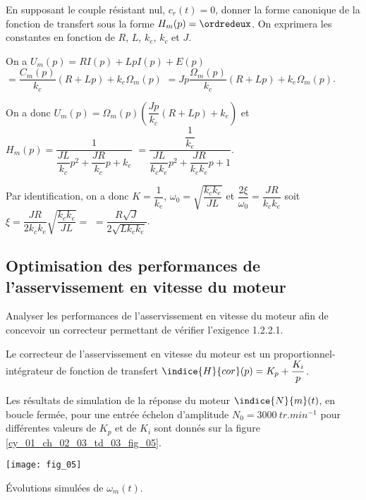 \begin{question}
En supposant le couple résistant nul, $c_r(t) = 0$, donner la forme canonique de la fonction de
transfert  sous la forme $H_m(p) = \ordredeux$. On exprimera les constantes en fonction de $R$, $L$, $k_e$, $k_c$ et $J$.
\end{question}
\ifprof
\begin{corrige}
On a $U_m(p) = RI(p) + L pI(p) + E(p)$
$ =  \dfrac{C_m(p)}{k_c} \left(R+ Lp\right) + k_e\Omega_m(p) $
$ =  Jp\dfrac{\Omega_m(p)}{k_c} \left(R+ Lp\right) + k_e\Omega_m(p) $.

On a donc 
$U_m(p) =\Omega_m(p)\left(\dfrac{Jp}{k_c} \left(R+ Lp\right) + k_e\right) $ 
et $H_m(p)=\dfrac{1}{\dfrac{JL}{k_c}p^2 +\dfrac{JR}{k_c}p + k_e}$
$=\dfrac{\dfrac{1}{k_e}}{\dfrac{JL}{k_ck_e}p^2 +\dfrac{JR}{k_ck_e}p + 1}$.

Par identification, on a donc $K= \dfrac{1}{k_e}$, $\omega_0 =\sqrt{ \dfrac{k_ck_e}{JL}}$ et
$\dfrac{2\xi}{\omega_0}= \dfrac{JR}{k_ck_e}$ soit $\xi =  \dfrac{JR}{2 k_ck_e}\sqrt{ \dfrac{k_ck_e}{JL}} = $
$=  \dfrac{R\sqrt{J}}{2 \sqrt{L k_ck_e}} $.

\end{corrige}
\else
\fi


\subsection*{Optimisation des performances de l’asservissement en vitesse du moteur}
\begin{obj}
Analyser les performances de l’asservissement en vitesse du moteur afin de concevoir un
correcteur permettant de vérifier l’exigence 1.2.2.1.
\end{obj}


\ifprof
\else
Le correcteur de l’asservissement en vitesse du moteur est un proportionnel-intégrateur de fonction
de transfert $\indice{H}{cor}(p) = K_p+\dfrac{K_i}{p}$.

Les résultats de simulation de la réponse du moteur $\indice{N}{m}(t)$, en boucle fermée, pour une entrée échelon
d’amplitude $N_0 = \SI{3 000}{tr.min^{-1}}$ pour différentes valeurs de $K_p$ et de $K_i$ sont donnés sur la figure \ref{cy_01_ch_02_03_td_03_fig_05}.


\fi

\begin{marginfigure}[-3cm]
\centering
\texttt{[image: fig\_05]}
\caption{Évolutions simulées de $\omega_m(t)$.}
\label{cy_01_ch_02_03_td_03_fig_05}
\end{marginfigure}




